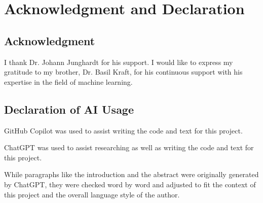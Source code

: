 


\section{Acknowledgment and Declaration}
\label{acknowledgment_declaration}

\subsection{Acknowledgment}%

I thank Dr. Johann Junghardt for his support.
I would like to express my gratitude to my brother, Dr. Basil Kraft, for his continuous
support with his expertise in the field of machine learning. 

\subsection{Declaration of AI Usage}%

GitHub Copilot was used to assist writing the code and text for this project.

ChatGPT was used to assist researching as well as writing the code and text for this project.

While paragraphs like the introduction and the abstract were originally generated by ChatGPT, 
they were checked word by word and adjusted to fit the context of this project 
and the overall language style of the author.

\newpage
{}

